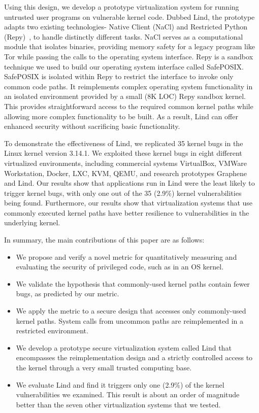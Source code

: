 Using this design, we develop a prototype virtualization system for
running untrusted user programs on vulnerable kernel code. Dubbed Lind, the
prototype adapts two existing technologies- Native Client (NaCl) \cite{NaCl-09} and
Restricted Python (Repy)~\cite{Repy-10}, to handle distinctly different tasks. NaCl serves as a computational
module that isolates binaries, providing memory safety for a legacy program like
Tor while passing the calls to the operating system interface.
Repy is a sandbox technique we used to build our operating system interface called SafePOSIX. 
SafePOSIX is isolated within Repy to restrict the interface to invoke only common code paths.
It reimplements complex operating system functionality in an isolated
environment provided by a small (8K LOC) Repy sandbox kernel. This provides
straightforward access to the required common kernel paths while allowing more
complex functionality to be built.
As a result, Lind can offer enhanced security without sacrificing basic functionality.

To demonstrate the effectiveness of Lind, we replicated 35 kernel bugs in the Linux kernel
version 3.14.1. We exploited these kernel bugs %
in eight different virtualized environments, including
commercial systems VirtualBox, VMWare Workstation, Docker, LXC,
KVM, QEMU, and research prototypes Graphene and Lind. Our results show
that applications run in Lind were the least likely to trigger kernel bugs,
with only one out of the 35 (2.9\%) kernel vulnerabilities being found.
Furthermore, our results show that virtualization systems that use commonly
executed kernel paths have better resilience to vulnerabilities
in the underlying kernel.

In summary, the main contributions of this paper are as follows:

\begin{itemize}\setlength\itemsep{0em}
\item
We propose and verify a novel metric for quantitatively measuring and evaluating
the security of privileged code, such as in an OS kernel.

\item
We validate the hypothesis that commonly-used kernel paths contain fewer bugs,
as predicted by our metric.

\item
We apply the metric to a secure design that accesses only commonly-used
kernel paths. System calls from uncommon paths are reimplemented in a
restricted environment.

\item
We develop a prototype secure virtualization system called Lind that encompasses
the reimplementation design and a strictly controlled access to the kernel
through a very small trusted computing base.

\item
We evaluate Lind and find it triggers only one (2.9\%) of the kernel vulnerabilities
we examined. This result is about an order of magnitude better than the seven other virtualization systems
that we tested.
\end{itemize}

